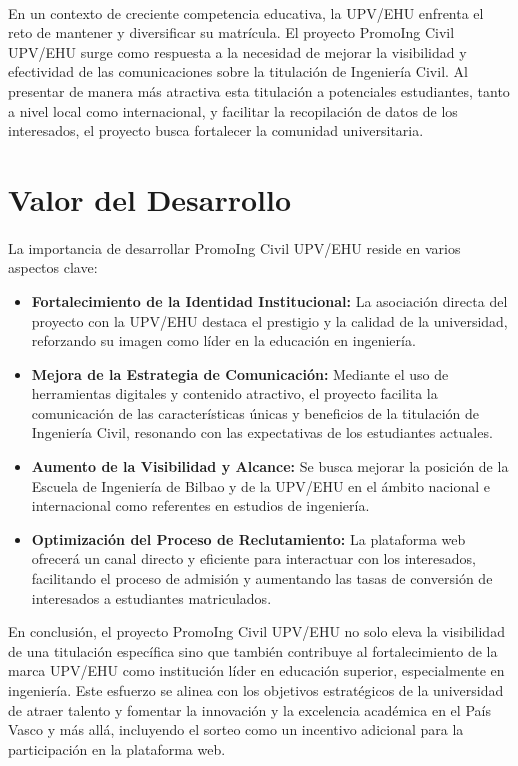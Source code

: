 \documentclass{report}
\begin{document}
            \paragraph*{}
            En un contexto de creciente competencia educativa, la UPV/EHU enfrenta el reto de mantener y diversificar su matrícula. El proyecto PromoIng Civil UPV/EHU surge como respuesta a la necesidad de mejorar la visibilidad y efectividad de las comunicaciones sobre la titulación de Ingeniería Civil. Al presentar de manera más atractiva esta titulación a potenciales estudiantes, tanto a nivel local como internacional, y facilitar la recopilación de datos de los interesados, el proyecto busca fortalecer la comunidad universitaria.
        \section{Valor del Desarrollo}
            \paragraph*{}
            La importancia de desarrollar PromoIng Civil UPV/EHU reside en varios aspectos clave:
            \begin{itemize}
                \item \textbf{Fortalecimiento de la Identidad Institucional:} La asociación directa del proyecto con la UPV/EHU destaca el prestigio y la calidad de la universidad, reforzando su imagen como líder en la educación en ingeniería.
                \item \textbf{Mejora de la Estrategia de Comunicación:} Mediante el uso de herramientas digitales y contenido atractivo, el proyecto facilita la comunicación de las características únicas y beneficios de la titulación de Ingeniería Civil, resonando con las expectativas de los estudiantes actuales.
                \item \textbf{Aumento de la Visibilidad y Alcance:} Se busca mejorar la posición de la Escuela de Ingeniería de Bilbao y de la UPV/EHU en el ámbito nacional e internacional como referentes en estudios de ingeniería.
                \item \textbf{Optimización del Proceso de Reclutamiento:} La plataforma web ofrecerá un canal directo y eficiente para interactuar con los interesados, facilitando el proceso de admisión y aumentando las tasas de conversión de interesados a estudiantes matriculados.
            \end{itemize}
            En conclusión, el proyecto PromoIng Civil UPV/EHU no solo eleva la visibilidad de una titulación específica sino que también contribuye al fortalecimiento de la marca UPV/EHU como institución líder en educación superior, especialmente en ingeniería. Este esfuerzo se alinea con los objetivos estratégicos de la universidad de atraer talento y fomentar la innovación y la excelencia académica en el País Vasco y más allá, incluyendo el sorteo como un incentivo adicional para la participación en la plataforma web.
\end{document}
